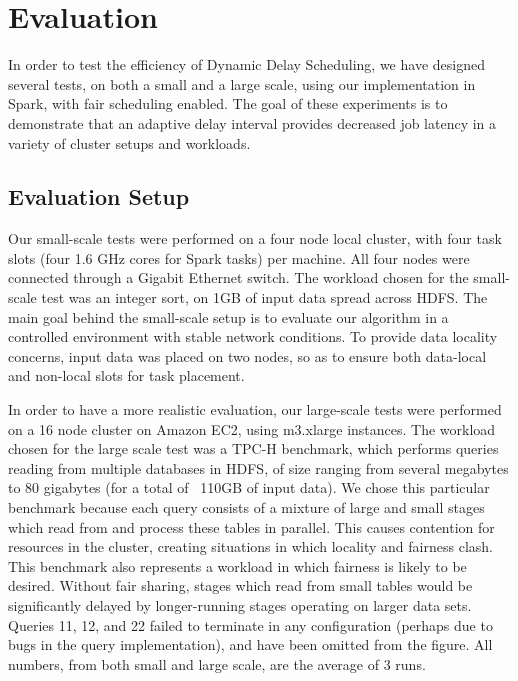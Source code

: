 
\section{Evaluation}\label{sec:eval}

In order to test the efficiency of Dynamic Delay Scheduling, we have designed several 
tests, on both a small and a large scale, using our implementation in Spark, with fair
scheduling enabled. The goal of
these experiments is to demonstrate that an adaptive delay interval provides decreased
job latency in a variety of cluster setups and workloads.

\subsection{Evaluation Setup}
Our small-scale tests were performed on a four node local cluster, with four
task slots (four 1.6 GHz cores for Spark tasks) per machine. All four nodes were
connected through a Gigabit Ethernet switch. The workload chosen for the
small-scale test was an integer sort, on 1GB of input data spread across HDFS.
The main goal behind the small-scale setup is to evaluate our algorithm in a
controlled environment with stable network conditions. To provide data locality
concerns, input data was placed on two nodes, so as to ensure both data-local
and non-local slots for task placement.

In order to have a more realistic evaluation, our large-scale tests were
performed on a 16 node cluster on Amazon EC2, using m3.xlarge instances. The
workload chosen for the large scale test was a TPC-H benchmark, which
performs queries reading from multiple databases in HDFS, of size ranging from
several megabytes to 80 gigabytes (for a total of ~110GB of input data).
We chose this particular benchmark because each query
consists of a mixture of large and small stages which read from and process these tables
in parallel. This causes contention for resources in the cluster, creating
situations in which locality and fairness clash. This benchmark also represents
a workload in which fairness is likely to be desired. Without fair sharing,
stages which read from small tables would be significantly delayed by
longer-running stages operating on larger data sets. Queries 11, 12, and 22 failed
to terminate in any configuration (perhaps due to bugs in the query implementation),
and have been omitted from the figure.
All numbers, from both small and large scale, are the average of 3 runs.

